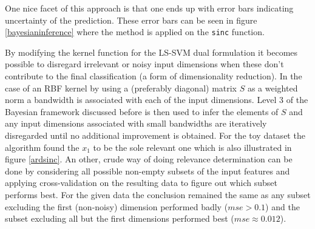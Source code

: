 One nice facet of this approach is that one ends up with error bars indicating uncertainty of the prediction. These error bars can be seen in figure \ref{bayesianinference} where the method is applied on the \texttt{sinc} function.


By modifying the kernel function for the LS-SVM dual formulation it becomes possible to disregard irrelevant or noisy input dimensions when these don't contribute to the final classification (a form of dimensionality reduction). In the case of an RBF kernel by using a (preferably diagonal) matrix $S$ as a weighted norm a bandwidth is associated with each of the input dimensions. Level 3 of the Bayesian framework discussed before is then used to infer the elements of $S$ and any input dimensions associated with small bandwidths are iteratively disregarded until no additional improvement is obtained. For the toy dataset the algorithm found the $x_1$ to be the sole relevant one which is also illustrated in figure \ref{ardsinc}. An other, crude way of doing relevance determination can be done by considering all possible non-empty subsets of the input features and applying cross-validation on the resulting data to figure out which subset performs best. For the given data the conclusion remained the same as any subset excluding the first (non-noisy) dimension performed badly ($mse>0.1$) and the subset excluding all but the first dimensions performed best ($mse\approx 0.012$).


